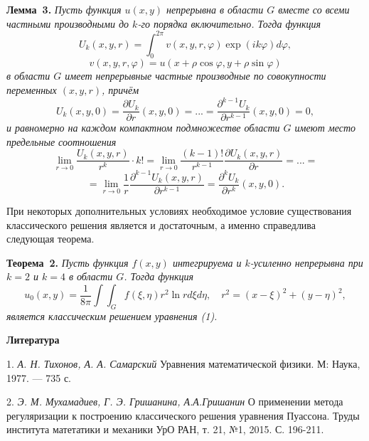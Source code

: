 \textbf{Лемма~3.}
{\it Пусть функция $u(x,y)$ непрерывна в области $G$ вместе со
всеми частными производными до $k$-го порядка включительно.
Тогда функция
$$
U_{k}(x,y,r)=\int_{0}^{2\pi}v(x,y,r,\varphi)\exp(ik\varphi) d\varphi,
$$
$$
 v(x,y,r,\varphi)=u(x+\rho \cos \varphi,y+\rho \sin \varphi)
$$
в области $G$ имеет непрерывные частные производные по
совокупности переменных $(x,y,r)$, причём
$$
U_{k}(x,y,0)=\frac{\partial U_{k}}{\partial r}(x,y,0)=
...=\frac{\partial^{k-1} U_{k}}{\partial r^{k-1}}(x,y,0)=0,
$$
и равномерно на каждом компактном подмножестве
области $G$ имеют место предельные соотношения
$$
\lim_{r\to 0}\frac{U_{k}(x,y,r)}{r^{k}}\cdot k!=
\lim_{r\to 0}\frac{(k-1)!}{r^{k-1}}\frac{\partial U_{k}(x,y,r)}{\partial r}=...=
$$
$$
=\lim_{r\to 0}\frac{1}{r}\frac{\partial^{k-1} U_{k}(x,y,r)}{\partial r^{k-1}}=
\frac{\partial^{k} U_{k}}{\partial r^{k}}(x,y,0).
$$
}

При некоторых дополнительных условиях необходимое условие
существования классического решения является и достаточным,
а именно справедлива следующая теорема.

\textbf{Теорема~2.}
  {\it Пусть функция $f(x,y)$ интегрируема и $k$-усиленно непрерывна
при $k=2$ и $k=4$ в области $G$. Тогда функция
$$
u_{0}(x,y)=\frac{1}{8\pi}\int\int_{G}f(\xi,\eta)r^{2}\ln r d\xi d\eta,\quad
r^{2}=(x-\xi)^{2}+(y-\eta)^{2},
$$
является классическим решением уравнения (1).}


\smallskip \centerline{\bf Литература}\nopagebreak

1. {\it А. Н. Тихонов, А. А. Самарский } Уравнения математической физики. М: Наука, 1977. — 735 с.

2. {\it Э. М. Мухамадиев, Г. Э. Гришанина, А.А.Гришанин} О применении метода регуляризации к построению классического решения уравнения Пуассона. Труды института матетатики и механики УрО РАН, т. 21, №1, 2015. С. 196-211.
